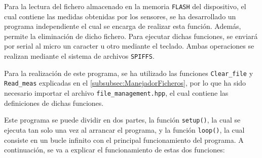 Para la lectura del fichero almacenado en la memoria \texttt{FLASH} del dispositivo, el cual contiene las medidas obtenidas por los sensores, se ha desarrollado un programa independiente el cual se encarga de realizar esta función. Además, permite la eliminación de dicho fichero. Para ejecutar dichas funciones, se enviará por serial al micro un caracter u otro mediante el teclado. Ambas operaciones se realizan mediante el sistema de archivos \texttt{SPIFFS}.


Para la realización de este programa, se ha utilizado las funciones \texttt{Clear\_file} y \texttt{Read\_meas} explicadas en el \autoref{subsubsec:ManejadorFicheros}, por lo que ha sido necesario importar el archivo \texttt{file\_management.hpp}, el cual contiene las definiciones de dichas funciones.

Este programa se puede dividir en dos partes, la función \texttt{setup()}, la cual se ejecuta tan solo una vez al arrancar el programa, y la función \texttt{loop()}, la cual consiste en un bucle infinito con el principal funcionamiento del programa. A continuación, se va a explicar el funcionamiento de estas dos funciones:

